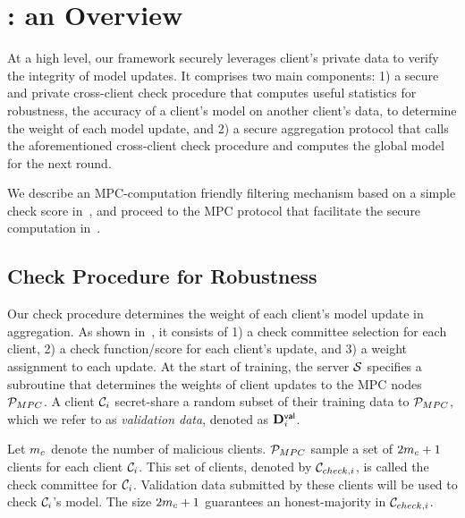 \section{\ours: an Overview}
\label{sec:framework}





At a high level, our framework securely leverages client's private data to verify the integrity of model updates. It comprises two main components: 1) a secure and private cross-client check procedure that computes useful statistics for robustness, \eg the accuracy of a client's model on another client's data, to determine the weight of each model update, and 2) a secure aggregation protocol that calls the aforementioned cross-client check procedure and computes the global model for the next round.

We describe an MPC-computation friendly filtering mechanism based on a simple check score in~, and proceed to the MPC protocol that facilitate the secure computation in~.







\subsection{Check Procedure for Robustness}
\label{sec:slvr-check}
Our check procedure determines the weight of each client's model update in aggregation. As shown in~, it consists of 1) a check committee selection for each client, 2) a check function/score for each client's update, and 3) a weight assignment to each update.  
At the start of training, the server $\mathcal{S}$ specifies a subroutine that determines the weights of client updates to the MPC nodes $\mathcal{P}_{MPC}$. A client $\mathcal{C}_i$ secret-share a random subset of their training data to $\mathcal{P}_{MPC}$, which we refer to as \textit{validation data}, denoted as $\mathbf{D}^{\mathsf{val}}_i$. 







 Let $m_c$ denote the number of malicious clients. 
$\mathcal{P}_{MPC}$ sample a set of $2 m_c + 1$ clients for each client $\mathcal{C}_i$. This set of clients, denoted by $\mathcal{C}_{check, i}$, is called the check committee for $\mathcal{C}_i$. Validation data submitted by these clients will be used to check $\mathcal{C}_i$'s model. The size $2m_c+1$ guarantees an honest-majority in $\mathcal{C}_{check, i}$.


